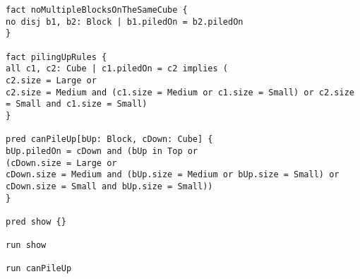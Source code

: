 \begin{enumerate}
\begin{lstlisting}[language=alloy]
fact noMultipleBlocksOnTheSameCube {
no disj b1, b2: Block | b1.piledOn = b2.piledOn
}

fact pilingUpRules {
all c1, c2: Cube | c1.piledOn = c2 implies (
c2.size = Large or
c2.size = Medium and (c1.size = Medium or c1.size = Small) or c2.size = Small and c1.size = Small)
}

pred canPileUp[bUp: Block, cDown: Cube] {
bUp.piledOn = cDown and (bUp in Top or
(cDown.size = Large or
cDown.size = Medium and (bUp.size = Medium or bUp.size = Small) or cDown.size = Small and bUp.size = Small))
}   

pred show {} 

run show

run canPileUp 
    \end{lstlisting}
\end{enumerate}